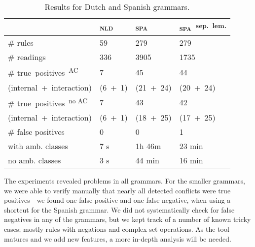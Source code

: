 {{\begin{table}[]
\centering
\begin{tabular}{|p{2.84cm}|p{1cm}|p{1.15cm}|p{1.55cm}|}

\hline
                   & \textsc{nld}  & \textsc{spa}  & \textsc{spa}~\textsuperscript{sep.~lem.} \\ \hline
\# rules           & 59            & 279       & 279     \\ \hline
\# readings        & 336           & 3905      & 1735    \\ \hline
\# true~positives~\textsuperscript{AC}%
                   & 7             & 45        & 44      \\ 
{\small (internal~+~interaction)}
                   & {\small
                      (6~+~1)}     & {\small 
                                    (21~+~24)} & {\small (20~+~24)} \\ \hline

\# true~positives~\textsuperscript{no AC}  & 7             & 43        & 42      \\ 
{\small (internal~+~interaction)}
                   & {\small
                      (6~+~1)}     & {\small 
                                    (18~+~25)} & {\small (17~+~25)} \\ \hline
\# false positives 
                   & 0             & 0        & 1  \\ \hline

\clock{} with amb. 
           classes & 7 s        & 1h 46m   &  23 min  \\ \hline

\clock{} no amb. 
           classes & 3 s        & 44 min       & 16 min     \\ \hline 


\end{tabular}
\caption{Results for Dutch and Spanish grammars.}
\label{table:res}
\end{table}




The experiments revealed problems in all grammars. For the smaller
grammars, we were able to verify manually that nearly all detected conflicts were
true positives---we found one false positive and one false negative,
when using a shortcut for the Spanish grammar. 
We did not systematically check for false negatives in any of the
grammars, but we kept track of a number of known tricky cases; mostly
rules with negations and complex set operations.
As the tool matures and we add new features, a more in-depth analysis
will be needed.

}}
